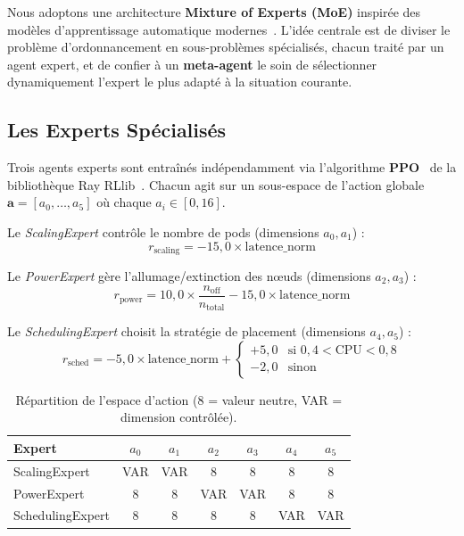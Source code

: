 
Nous adoptons une architecture \textbf{Mixture of Experts (MoE)} inspirée des modèles d'apprentissage automatique modernes~\cite{jacobs1991moe}. L'idée centrale est de diviser le problème d'ordonnancement en sous-problèmes spécialisés, chacun traité par un agent expert, et de confier à un \textbf{meta-agent} le soin de sélectionner dynamiquement l'expert le plus adapté à la situation courante.

\subsection{Les Experts Spécialisés}

Trois agents experts sont entraînés indépendamment via l'algorithme \textbf{PPO}~\cite{schulman2017ppo} de la bibliothèque Ray RLlib~\cite{liang2018rllib}. Chacun agit sur un sous-espace de l'action globale $\mathbf{a} = [a_0,\ldots,a_5]$ où chaque $a_i \in [0, 16]$.

Le \textit{ScalingExpert} contrôle le nombre de pods (dimensions $a_0, a_1$) :
\[r_{\text{scaling}} = -15{,}0 \times \text{latence\_norm}\]

Le \textit{PowerExpert} gère l'allumage/extinction des nœuds (dimensions $a_2, a_3$) :
\[r_{\text{power}} = 10{,}0 \times \frac{n_{\text{off}}}{n_{\text{total}}} - 15{,}0 \times \text{latence\_norm}\]

Le \textit{SchedulingExpert} choisit la stratégie de placement (dimensions $a_4, a_5$) :
\[r_{\text{sched}} = -5{,}0 \times \text{latence\_norm} + \begin{cases} +5{,}0 & \text{si } 0{,}4 < \text{CPU} < 0{,}8 \\ -2{,}0 & \text{sinon} \end{cases}\]

\begin{table}[h]
\centering
\footnotesize
\begin{tabular}{|l|c|c|c|c|c|c|}
\hline
\textbf{Expert} & $a_0$ & $a_1$ & $a_2$ & $a_3$ & $a_4$ & $a_5$ \\
\hline
ScalingExpert   & VAR & VAR & 8 & 8 & 8 & 8 \\
PowerExpert     & 8 & 8 & VAR & VAR & 8 & 8 \\
SchedulingExpert & 8 & 8 & 8 & 8 & VAR & VAR \\
\hline
\end{tabular}
\caption{Répartition de l'espace d'action (8 = valeur neutre, VAR = dimension contrôlée).}
\label{tab:action_space}
\end{table}

